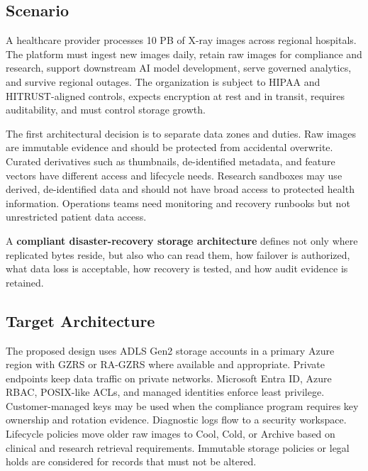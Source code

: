 \subsection{Scenario}
A healthcare provider processes 10 PB of X-ray images across regional hospitals. The platform must ingest new images daily, retain raw images for compliance and research, support downstream AI model development, serve governed analytics, and survive regional outages. The organization is subject to HIPAA and HITRUST-aligned controls, expects encryption at rest and in transit, requires auditability, and must control storage growth.

The first architectural decision is to separate data zones and duties. Raw images are immutable evidence and should be protected from accidental overwrite. Curated derivatives such as thumbnails, de-identified metadata, and feature vectors have different access and lifecycle needs. Research sandboxes may use derived, de-identified data and should not have broad access to protected health information. Operations teams need monitoring and recovery runbooks but not unrestricted patient data access.

\begin{definitionbox}
A \textbf{compliant disaster-recovery storage architecture} defines not only where replicated bytes reside, but also who can read them, how failover is authorized, what data loss is acceptable, how recovery is tested, and how audit evidence is retained.
\end{definitionbox}

\subsection{Target Architecture}
The proposed design uses ADLS Gen2 storage accounts in a primary Azure region with GZRS or RA-GZRS where available and appropriate. Private endpoints keep data traffic on private networks. Microsoft Entra ID, Azure RBAC, POSIX-like ACLs, and managed identities enforce least privilege. Customer-managed keys may be used when the compliance program requires key ownership and rotation evidence. Diagnostic logs flow to a security workspace. Lifecycle policies move older raw images to Cool, Cold, or Archive based on clinical and research retrieval requirements. Immutable storage policies or legal holds are considered for records that must not be altered.

